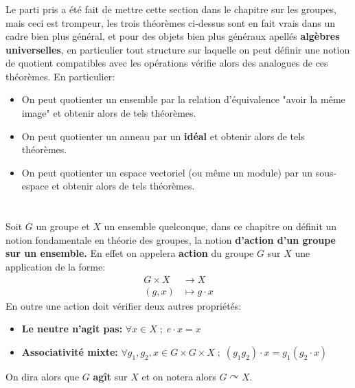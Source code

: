 \subsection*{}

\subsection*{}
Le parti pris a été fait de mettre cette section dans le chapitre sur les groupes, mais ceci est trompeur, les trois théorèmes ci-dessus sont en fait vrais dans un cadre bien plus général, et pour des objets bien plus généraux apellés \textbf{algèbres universelles}, en particulier tout structure sur laquelle on peut définir une notion de quotient compatibles avec les opérations vérifie alors des analogues de ces théorèmes. En particulier:
\begin{itemize}
   \item On peut quotienter un ensemble par la relation d'équivalence "avoir la même image" et obtenir alors de tels théorèmes.
   \item On peut quotienter un anneau par un \textbf{idéal} et obtenir alors de tels théorèmes.
   \item On peut quotienter un espace vectoriel (ou même un module) par un sous-espace et obtenir alors de tels théorèmes.
\end{itemize}
\subsection*{}
\chapter*{}
Soit \( G \) un groupe et \( X \) un ensemble quelconque, dans ce chapitre on définit un notion fondamentale en théorie des groupes, la notion \textbf{d'action d'un groupe sur un ensemble.} En effet on appelera \textbf{action} du groupe \( G \) sur \( X \) une application de la forme:
\[ 
   \begin{aligned}
      G \times X &\longrightarrow X\\
      (g, x) &\longmapsto g \cdot x
   \end{aligned}
\]
En outre une action doit vérifier deux autres propriétés:
\begin{itemize}
   \item \textbf{Le neutre n'agit pas: } \( \forall x \in X \; ; \; e \cdot x = x \)
   \item \textbf{Associativité mixte: } \( \forall g_1, g_2, x \in G \times G \times X \; ; \; (g_1g_2) \cdot x = g_1(g_2 \cdot x) \)
\end{itemize}
On dira alors que \( G \) \textbf{agît} sur \( X \) et on notera alors \( G \curvearrowright X \).

